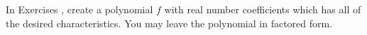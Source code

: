 {\noindent In Exercises}
{, create a polynomial $f$ with real number coefficients which has all of the desired characteristics.  You may leave the polynomial in factored form. }

